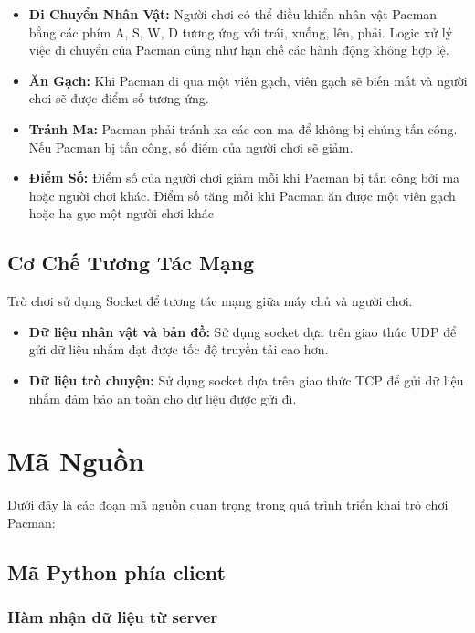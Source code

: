 \documentclass[a4paper]{article}
\begin{document}
\begin{itemize}
    \item \textbf{Di Chuyển Nhân Vật:} Người chơi có thể điều khiển nhân vật Pacman bằng các phím A, S, W, D tương ứng với trái, xuống, lên, phải. Logic xử lý việc di chuyển của Pacman cũng như hạn chế các hành động không hợp lệ.
    \item \textbf{Ăn Gạch:} Khi Pacman đi qua một viên gạch, viên gạch sẽ biến mất và người chơi sẽ được điểm số tương ứng.
    \item \textbf{Tránh Ma:} Pacman phải tránh xa các con ma để không bị chúng tấn công. Nếu Pacman bị tấn công, số điểm của người chơi sẽ giảm.
    \item \textbf{Điểm Số:} Điểm số của người chơi giảm mỗi khi Pacman bị tấn công bởi ma hoặc người chơi khác. Điểm số tăng mỗi khi Pacman ăn được một viên gạch hoặc hạ gục một người chơi khác
\end{itemize}

\subsection{Cơ Chế Tương Tác Mạng}

Trò chơi sử dụng Socket để tương tác mạng giữa máy chủ và người chơi.
\begin{itemize}
    \item \textbf{Dữ liệu nhân vật và bản đồ:} Sử dụng socket dựa trên giao thúc UDP để gửi dữ liệu nhắm đạt được tốc độ truyền tải cao hơn.
    \item \textbf{Dữ liệu trò chuyện:} Sử dụng socket dựa trên giao thức TCP để gửi dữ liệu nhắm đảm bảo an toàn cho dữ liệu được gửi đi.
\end{itemize}
\newpage
\section{Mã Nguồn}

Dưới đây là các đoạn mã nguồn quan trọng trong quá trình triển khai trò chơi Pacman:

\subsection{Mã Python phía client}

\subsubsection{Hàm nhận dữ liệu từ server}
\end{document}

